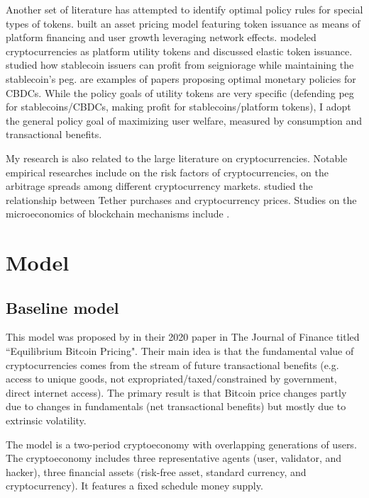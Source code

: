 \documentclass[12pt]{article}
\begin{document}
Another set of literature has attempted to identify optimal policy rules for special types of tokens. \citet{cong2021tokenomics, cong2022token} built an asset pricing model featuring token issuance as means of platform financing and user growth leveraging network effects. \citet{sockin2023decentralization, sockin2023model} modeled cryptocurrencies as platform utility tokens and discussed elastic token issuance. \citet{d2022can} studied how stablecoin issuers can profit from seigniorage while maintaining the stablecoin's peg. \citet{fernandez2021central, zhu2019framework} are examples of papers proposing optimal monetary policies for CBDCs. While the policy goals of utility tokens are very specific (defending peg for stablecoins/CBDCs, making profit for stablecoins/platform tokens), I adopt the general policy goal of maximizing user welfare, measured by consumption and transactional benefits.

My research is also related to the large literature on cryptocurrencies. Notable empirical researches include \cite{liu2021risks} on the risk factors of cryptocurrencies, \cite{makarov2020trading} on the arbitrage spreads among different cryptocurrency markets. \cite{griffin2020bitcoin} studied the relationship between Tether purchases and cryptocurrency prices. Studies on the microeconomics of blockchain mechanisms include \citet{budish2018economic, biais2019blockchain, gans2019more, gans2022mechanism, huberman2021monopoly}.


\section{Model} 
\label{sec:model}

\subsection{Baseline model} 
\label{sec:baseline}
This model was proposed by \citeauthor*{biais2023equilibrium} in their 2020 paper in The Journal of Finance titled ``Equilibrium Bitcoin Pricing". Their main idea is that the fundamental value of cryptocurrencies comes from the stream of future transactional benefits (e.g. access to unique goods, not expropriated/taxed/constrained by government, direct internet access). The primary result is that Bitcoin price changes partly due to changes in fundamentals (net transactional benefits) but mostly due to extrinsic volatility.

The model is a two-period cryptoeconomy with overlapping generations of users. The cryptoeconomy includes three representative agents (user, validator, and hacker), three financial assets (risk-free asset, standard currency, and cryptocurrency). It features a fixed schedule money supply.
\end{document}
